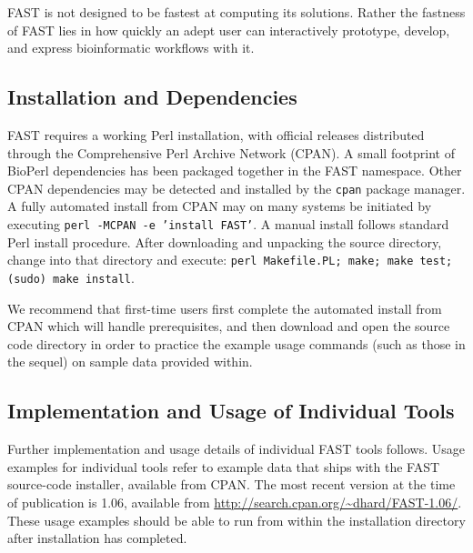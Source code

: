 \documentclass{frontiersSCNS} %
\begin{document}
FAST is not designed to be fastest at computing its
solutions. Rather the fastness of FAST lies in how quickly an adept
user can interactively prototype, develop, and express bioinformatic
workflows with it.

\subsection{Installation and Dependencies}
FAST requires a working Perl installation, with official releases
distributed through the Comprehensive Perl Archive Network (CPAN). A
small footprint of BioPerl dependencies has been packaged together in
the FAST namespace. Other CPAN dependencies may be detected and
installed by the {\tt cpan} package manager. A fully automated install
from CPAN may on many systems be initiated by executing {\tt perl
  -MCPAN -e 'install FAST'}. A manual install follows standard Perl
install procedure. After downloading and unpacking the source
directory, change into that directory and execute: {\tt perl
  Makefile.PL; make; make test; (sudo) make install}.

We recommend that first-time users first complete the automated
install from CPAN which will handle prerequisites, and then download
and open the source code directory in order to practice the example
usage commands (such as those in the sequel) on sample data provided
within.

\subsection{Implementation and Usage of Individual Tools}

Further implementation and usage details of individual FAST tools
follows. Usage examples for individual tools refer to example data
that ships with the FAST source-code installer, available from CPAN.
The most recent version at the time of publication is 1.06, available
from \url{http://search.cpan.org/~dhard/FAST-1.06/}. These usage
examples should be able to run from within the installation directory
after installation has completed.
\end{document}
